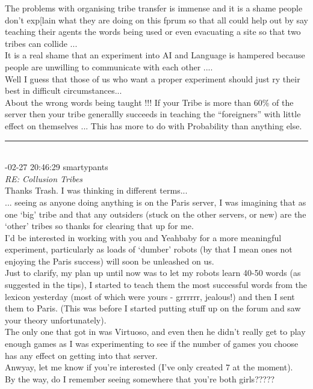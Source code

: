 \begin{mail}
The problems with organising tribe transfer is immense and it is a shame people don't exp[lain what they are doing on this fprum so that all could help out by say teaching their agents the words being used or even evacuating a site so that two tribes can collide ...\\
It is a real shame that an experiment into AI and Language is hampered because people are unwilling to communicate with each other .... \\
Well I guess that those of us who want a proper experiment should just ry their best in difficult circumstances...\\
About the wrong words being taught !!! If your Tribe is more than 60\% of the server then your tribe generallly succeeds in teaching the ``foreigners'' with little effect on themselves ... This has more to do with Probability than anything else.
\rule{0.8\textwidth}{.4pt}\\
{-02-27 20:46:29 smartypants}\\
{\itshape RE: Collusion Tribes}\\
Thanks Trash. I was thinking in different terms...\\
... seeing as anyone doing anything is on the Paris server, I was imagining that as one `big' tribe and that any outsiders (stuck on the other servers, or new) are the `other' tribes so thanks for clearing that up for me.\\
I'd be interested in working with you and Yeahbaby for a more meaningful experiment, particularly as loads of `dumber' robots (by that I mean ones not enjoying the Paris success) will soon be unleashed on us.\\
Just to clarify, my plan up until now was to let my robots learn 40-50 words (as suggested in the tips), I started to teach them the most successful words from the lexicon yesterday (most of which were yours - grrrrrr, jealous!) and then I sent them to Paris. (This was before I started putting stuff up on the forum and saw your theory unfortunately). \\
The only one that got in was Virtuoso, and even then he didn't really get to play enough games as I was experimenting to see if the number of games you choose has any effect on getting into that server.\\
Anwyay, let me know if you're interested (I've only created 7 at the moment).\\
By the way, do I remember seeing somewhere that you're both girls?????\\

\end{mail}

